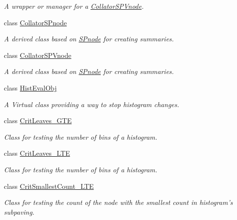 \begin{DoxyCompactItemize}
\begin{DoxyCompactList}\small\item\em \-A wrapper or manager for a \hyperlink{classsubpavings_1_1CollatorSPVnode}{\-Collator\-S\-P\-Vnode}. \end{DoxyCompactList}\item 
class \hyperlink{classsubpavings_1_1CollatorSPnode}{\-Collator\-S\-Pnode}
\begin{DoxyCompactList}\small\item\em \-A derived class based on \hyperlink{classsubpavings_1_1SPnode}{\-S\-Pnode} for creating summaries. \end{DoxyCompactList}\item 
class \hyperlink{classsubpavings_1_1CollatorSPVnode}{\-Collator\-S\-P\-Vnode}
\begin{DoxyCompactList}\small\item\em \-A derived class based on \hyperlink{classsubpavings_1_1SPnode}{\-S\-Pnode} for creating summaries. \end{DoxyCompactList}\item 
class \hyperlink{classsubpavings_1_1HistEvalObj}{\-Hist\-Eval\-Obj}
\begin{DoxyCompactList}\small\item\em \-A \-Virtual class providing a way to stop histogram changes. \end{DoxyCompactList}\item 
class \hyperlink{classsubpavings_1_1CritLeaves__GTE}{\-Crit\-Leaves\-\_\-\-G\-T\-E}
\begin{DoxyCompactList}\small\item\em \-Class for testing the number of bins of a histogram. \end{DoxyCompactList}\item 
class \hyperlink{classsubpavings_1_1CritLeaves__LTE}{\-Crit\-Leaves\-\_\-\-L\-T\-E}
\begin{DoxyCompactList}\small\item\em \-Class for testing the number of bins of a histogram. \end{DoxyCompactList}\item 
class \hyperlink{classsubpavings_1_1CritSmallestCount__LTE}{\-Crit\-Smallest\-Count\-\_\-\-L\-T\-E}
\begin{DoxyCompactList}\small\item\em \-Class for testing the count of the node with the smallest count in histogram's subpaving. \end{DoxyCompactList}\item 

\end{DoxyCompactItemize}

